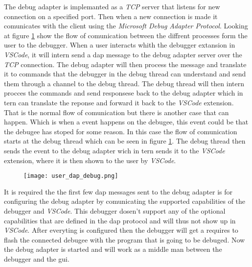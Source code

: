 
The debug adapter is implemanted as a \emph{TCP} server that listens for new connection on a specified port.
Then when a new connection is made it comunicates with the client using the \emph{Microsoft Debug Adapter Protocol}.
Looking at figure \ref{fig:userDAP} show the flow of comunication between the diffrent processes form the user to the debugger.
When a user interacts whith the debugger extansion in \emph{VSCode}, it will intern send a \acrshort{dap} message to the debug adapter server over the \emph{TCP} connection.
The debug adapter will then process the message and translate it to commands that the debugger in the debug thread can understand and send them through a channel to the debug thread.
The debug thread will then intern procces the commands and send responsese back to the debug adapter which in tern can translate the reponse and forward it back to the \emph{VSCode} extension.
That is the normal flow of comunication but there is another case that can happen.
Which is when a event happens on the debugee, this event could be that the debugee has stoped for some reason.
In this case the flow of comunication starts at the debug thread which can be seen in figure \ref{fig:userDAP}.
The debug thread then sends the event to the debug adapter wich in tern sends it to the \emph{VSCode} extension, where it is then shown to the user by \emph{VSCode}.


\begin{figure}[h]
    \centering
    \texttt{[image: user\_dap\_debug.png]}
    \label{fig:userDAP}
\end{figure}


It is required the the first few \acrshort{dap} messages sent to the debug adapter is for configuring the debug adapter by comunicating the supported capabilities of the debugger and \emph{VSCode}.
This debugger dosen't support any of the optional capabilities that are defined in the \acrshort{dap} protocol and will thus not show up in \emph{VSCode}.
After everyting is configured then the debugger will get a requires to flash the connected debugee with the program that is going to be debuged.
Now the debug adapter is started and will work as a middle man between the debugger and the \acrshort{gui}.


